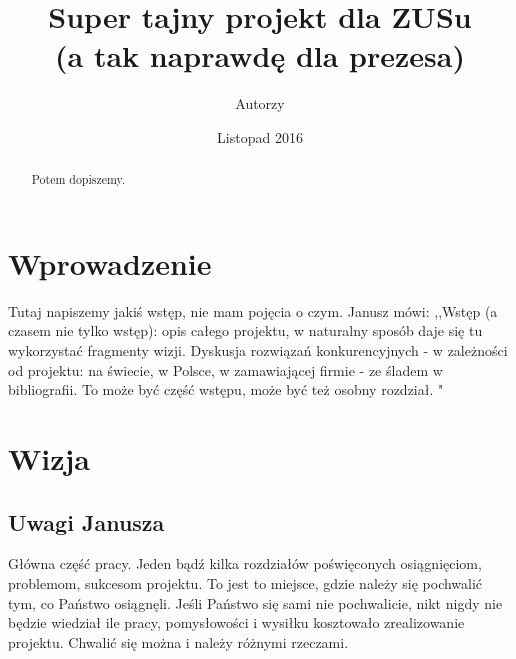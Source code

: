 \documentclass[licencjacka]{pracamgr}
\author{Autorzy}
\title{Super tajny projekt dla ZUSu\\
	(a tak naprawdę dla prezesa)}
\date{Listopad 2016}
\begin{document}
\maketitle

\begin{abstract}
  Potem dopiszemy.
\end{abstract}

\tableofcontents

\chapter*{Wprowadzenie} 
Tutaj napiszemy jakiś wstęp, nie mam pojęcia o czym. Janusz mówi: ,,Wstęp (a czasem nie tylko wstęp): opis całego projektu, w naturalny sposób daje się tu wykorzystać fragmenty wizji. Dyskusja rozwiązań konkurencyjnych - w zależności od projektu: na świecie, w Polsce, w zamawiającej firmie - ze śladem w bibliografii. To może być część wstępu, może być też osobny rozdział. "

\chapter{Wizja}\label{r:wizja}
\section{Uwagi Janusza}
Główna część pracy. Jeden bądź kilka rozdziałów poświęconych osiągnięciom, problemom, sukcesom projektu. To jest to miejsce, gdzie należy się pochwalić tym, co Państwo osiągnęli. Jeśli Państwo się sami nie pochwalicie, nikt nigdy nie będzie wiedział ile pracy, pomysłowości i wysiłku kosztowało zrealizowanie projektu. Chwalić się można i należy różnymi rzeczami.
\end{document}
